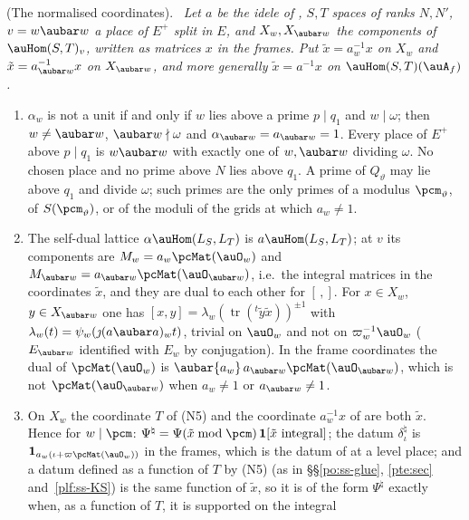 \documentclass[10pt]{amsart}
\theoremstyle{definition}
\theoremstyle{remark}
\newenvironment{quotedthm}[2]{\par\medskip\noindent\begingroup
  \textbf{#1}#2.\ \itshape\ignorespaces}{\endgroup\par\medskip}
\begin{document}
\begin{quotedthm}{\cite[Lemma~6.32]{P53}}{ (The normalised coordinates)}
Let $a$ be the idele of {\cite[\S5.1.1]{P49}}, $S,T$ spaces of ranks $N,N'$, $v=w\aubar w$ a place of
$E^+$ split in $E$, and $X_w,X_{\aubar w}$ the components of $\auHom(S,T)_v$, written as matrices $x$
in the frames. Put $\tilde x=a_w^{-1}x$ on $X_w$ and $\tilde x=a_{\aubar w}^{-1}x$ on $X_{\aubar w}$, and
more generally $\tilde x=a^{-1}x$ on $\auHom(S,T)(\auA_f)$.
\begin{enumerate}
\item[(a)] $\alpha_w$ is not a unit if and only if $w$ lies above a prime $p\mid q_1$ and $w\mid\omega$;
then $w\ne\aubar w$, $\aubar w\nmid\omega$ and $\alpha_{\aubar w}=a_{\aubar w}=1$. Every place of $E^+$
above $p\mid q_1$ is $w\aubar w$ with exactly one of $w,\aubar w$ dividing $\omega$. No chosen place
and no prime above $N$ lies above $q_1$. A prime of $Q_\vartheta$ may lie above $q_1$ and divide
$\omega$; such primes are the only primes of a modulus $\pcm_\vartheta$, of $S(\pcm_\vartheta)$, or of
the moduli of the grids at which $a_w\ne1$.
\item[(b)] The self-dual lattice $\alpha\auHom(L_S,L_T)$ is $a\auHom(L_S,L_T)$; at $v$ its components
are $M_w=a_w\pcMat(\auO_w)$ and $M_{\aubar w}=a_{\aubar w}\pcMat(\auO_{\aubar w})$, i.e.\ the integral
matrices in the coordinates $\tilde x$, and they are dual to each other for $[\,,]$. For $x\in X_w$,
$y\in X_{\aubar w}$ one has $[x,y]=\lambda_w(\operatorname{tr}({}^t\tilde y\tilde x))^{\pm1}$ with
$\lambda_w(t)=\psi_w(\jmath(a\aubar a)_wt)$, trivial on $\auO_w$ and not on $\varpi_w^{-1}\auO_w$
($E_{\aubar w}$ identified with $E_w$ by conjugation). In the frame coordinates the dual of
$\pcMat(\auO_w)$ is $\aubar{a_w}\,a_{\aubar w}\pcMat(\auO_{\aubar w})$, which is not
$\pcMat(\auO_{\aubar w})$ when $a_w\ne1$ or $a_{\aubar w}\ne1$.
\item[(c)] On $X_w$ the coordinate $T$ of (N5) and the coordinate $a_w^{-1}x$ of
{\cite[Definition~6.31]{P53}} are both $\tilde x$. Hence for $w\mid\pcm$:
$\Psi^\natural=\Psi(\tilde x\bmod\pcm)\,\mathbf 1[\tilde x\ \text{integral}]$; the datum
$\delta_\iota^\natural$ is $\mathbf 1_{a_w(\iota+\varpi\pcMat(\auO_w))}$ in the frames, which is the
datum of {\cite[\S5.1.3]{P49}} at a level place; and a datum defined as a function of $T$ by (N5) (as in
\S\S\ref{po:ss-glue}, \ref{pte:sec} and~\ref{plf:ss-KS}) is the same function of $\tilde x$, so it is
of the form $\Psi^\natural$ exactly when, as a function of $T$, it is supported on the integral

\end{enumerate}
\end{quotedthm}
\end{document}
